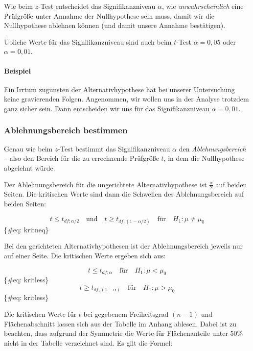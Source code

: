 \documentclass[
  ngerman,
]{article}
\begin{document}
Wie beim \(z\)-Test entscheidet das Signifikanzniveau \(\alpha\), wie \emph{unwahrscheinlich} eine Prüfgröße unter Annahme der Nullhypothese sein muss, damit wir die Nullhypothese ablehnen können (und damit unsere Annahme bestätigen).

Übliche Werte für das Signifikanzniveau sind auch beim \(t\)-Test \(\alpha=0{,}05\) oder \(\alpha=0{,}01\).

\hypertarget{beispiel-8}{%
\paragraph{Beispiel}\label{beispiel-8}}

Ein Irrtum zugunsten der Alternativhypothese hat bei unserer Untersuchung keine gravierenden Folgen. Angenommen, wir wollen uns in der Analyse trotzdem ganz sicher sein. Dann entscheiden wir uns für das Signifikanzniveau \(\alpha=0{,}01\).

\hypertarget{ablehnungsbereich-bestimmen-1}{%
\subsubsection{Ablehnungsbereich bestimmen}\label{ablehnungsbereich-bestimmen-1}}

Genau wie beim \(z\)-Test bestimmt das Signifikanzniveau \(\alpha\) den \emph{Ablehnungsbereich} -- also den Bereich für die zu errechnende Prüfgröße \(t\), in dem die Nullhypothese abgelehnt würde.

Der Ablehnungsbereich für die ungerichtete Alternativhypothese ist \(\frac{\alpha}{2}\) auf beiden Seiten. Die kritischen Werte sind dann die Schwellen des Ablehnungsbereich auf beiden Seiten:

\[
t \leq t_{\mathit{df};\alpha/2} \quad \textrm{und} \quad t \geq t_{\mathit{df};(1-\alpha/2)} \quad \textrm{für} \quad H_1: \mu \neq \mu_0
\]\{\#eq: kritneq\}

Bei den gerichteten Alternativhypothesen ist der Ablehnungsbereich jeweils nur auf einer Seite. Die kritischen Werte ergeben sich aus:

\[
t \leq t_{\mathit{df};\alpha} \quad \textrm{für} \quad H_1: \mu < \mu_0
\]\{\#eq: kritless\}
\[
t \geq t_{\mathit{df};(1-\alpha)} \quad \textrm{für} \quad H_1: \mu > \mu_0
\]\{\#eq: kritless\}

Die kritischen Werte für \(t\) bei gegebenem Freiheitsgrad \((n-1)\) und Flächenabschnitt lassen sich aus der Tabelle im Anhang ablesen. Dabei ist zu beachten, dass aufgrund der Symmetrie die Werte für Flächenanteile unter 50\% nicht in der Tabelle verzeichnet sind. Es gilt die Formel:
\end{document}
